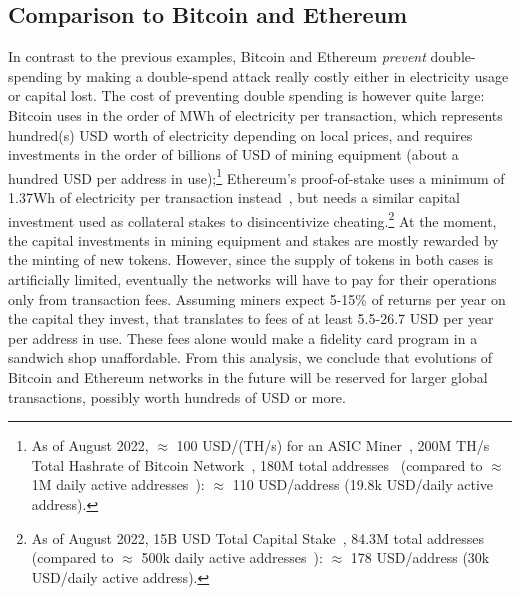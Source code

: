 \documentclass[sigconf,9pt]{acmart}
\begin{document}
\subsection{Comparison to Bitcoin and Ethereum}

In contrast to the previous examples, Bitcoin and Ethereum \textit{prevent} double-spending by making a double-spend attack really costly either in electricity usage or capital lost. The cost of preventing double spending is however quite large: Bitcoin uses in the order of MWh of electricity per transaction, which represents hundred(s) USD worth of electricity depending on local prices, and requires investments in the order of billions of USD of mining equipment (about a hundred USD per address in use);\footnote{As of August 2022, $\approx$ 100 USD/(TH/s) for an ASIC Miner~\cite{bitcoin-asic-mining}, 200M TH/s Total Hashrate of Bitcoin Network~\cite{total-hashrate}, 180M total addresses~\cite{bitcoin-stats} (compared to $\approx$ 1M daily active addresses~\cite{bitcoin-daily-active-addresses}): $\approx$ 110 USD/address (19.8k USD/daily active address).} Ethereum's proof-of-stake uses a minimum of 1.37Wh of electricity per transaction instead~\cite{ethereum-energy-consumption}, but needs a similar capital investment used as collateral stakes to disincentivize cheating.\footnote{As of August 2022, 15B USD Total Capital Stake~\cite{proof-of-stake}, 84.3M total addresses~\cite{ethereum-addresses} (compared to $\approx$ 500k daily active addresses~\cite{ethereum-daily-active-addresses}): $\approx$ 178 USD/address (30k USD/daily active address).} At the moment, the capital investments in mining equipment and stakes are mostly rewarded by the minting of new tokens. However, since the supply of tokens in both cases is artificially limited, eventually the networks will have to pay for their operations only from transaction fees. Assuming miners expect 5-15\% of returns per year on the capital they invest, that translates to fees of at least 5.5-26.7 USD per year per address in use. These fees alone would make a fidelity card program in a sandwich shop unaffordable. From this analysis, we conclude that evolutions of Bitcoin and Ethereum networks in the future will be reserved for larger global transactions, possibly worth hundreds of USD or more.
\end{document}
